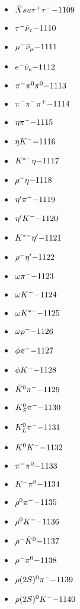 \begin{multicols}{3}
\begin{itemize}
 \item $ \bar{X}su \tau^{+} \tau^{-} \hfill{-1109}$
 \item $ \tau^{-} \bar{\nu}_{\tau} \hfill{-1110}$
 \item $ \mu^{-} \bar{\nu}_{\mu} \hfill{-1111}$
 \item $ e^{-} \bar{\nu}_{e} \hfill{-1112}$
 \item $ \pi^{-} \pi^{0} \pi^{0} \hfill{-1113}$
 \item $ \pi^{-} \pi^{-} \pi^{+} \hfill{-1114}$
 \item $ \eta \pi^{-} \hfill{-1115}$
 \item $ \eta K^{-} \hfill{-1116}$
 \item $ K^{*-} \eta \hfill{-1117}$
 \item $ \rho^{-} \eta \hfill{-1118}$
 \item $ {\eta^{\prime}} \pi^{-} \hfill{-1119}$
 \item $ {\eta^{\prime}} K^{-} \hfill{-1120}$
 \item $ K^{*-} {\eta^{\prime}} \hfill{-1121}$
 \item $ \rho^{-} {\eta^{\prime}} \hfill{-1122}$
 \item $ \omega \pi^{-} \hfill{-1123}$
 \item $ \omega K^{-} \hfill{-1124}$
 \item $ \omega K^{*-} \hfill{-1125}$
 \item $ \omega \rho^{-} \hfill{-1126}$
 \item $ \phi \pi^{-} \hfill{-1127}$
 \item $ \phi K^{-} \hfill{-1128}$
 \item $ \bar{K}^{0} \pi^{-} \hfill{-1129}$
 \item $ K_{S}^{0} \pi^{-} \hfill{-1130}$
 \item $ K_{L}^{0} \pi^{-} \hfill{-1131}$
 \item $ K^{0} K^{-} \hfill{-1132}$
 \item $ \pi^{-} \pi^{0} \hfill{-1133}$
 \item $ K^{-} \pi^{0} \hfill{-1134}$
 \item $ \rho^{0} \pi^{-} \hfill{-1135}$
 \item $ \rho^{0} K^{-} \hfill{-1136}$
 \item $ \rho^{-} \bar{K}^{0} \hfill{-1137}$
 \item $ \rho^{-} \pi^{0} \hfill{-1138}$
 \item $ \rho(2S)^{0} \pi^{-} \hfill{-1139}$
 \item $ \rho(2S)^{0} K^{-} \hfill{-1140}$

\end{itemize}
\end{multicols}
